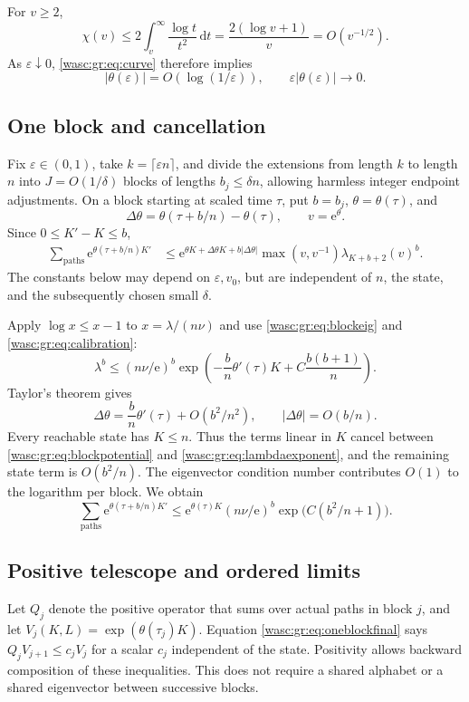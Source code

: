 \documentclass[11pt,a4paper]{article}
\theoremstyle{remark}\newtheorem{remark}[theorem]{Remark}
\newcommand{\dd}{\,\mathrm d}\newcommand{\ee}{\mathrm e}\newcommand{\Wc}{\mathcal W}
\numberwithin{equation}{section}
\begin{document}
For $v\ge2$,
\[
\chi(v)\le2\int_v^\infty\frac{\log t}{t^2}\dd t
=\frac{2(\log v+1)}v=O(v^{-1/2}).
\]
As $\varepsilon\downarrow0$, \eqref{wasc:gr:eq:curve} therefore implies
\begin{equation}\label{wasc:gr:eq:thetaendpoint}
|\theta(\varepsilon)|=O(\log(1/\varepsilon)),\qquad
\varepsilon|\theta(\varepsilon)|\longrightarrow0.
\end{equation}

\subsection{One block and cancellation}
Fix $\varepsilon\in(0,1)$, take $k=\lceil\varepsilon n\rceil$, and divide the extensions from length $k$ to length $n$ into $J=O(1/\delta)$ blocks of lengths $b_j\le\delta n$, allowing harmless integer endpoint adjustments. On a block starting at scaled time $\tau$, put $b=b_j$, $\theta=\theta(\tau)$, and
\[
\Delta\theta=\theta(\tau+b/n)-\theta(\tau),\qquad v=\ee^\theta.
\]
Since $0\le K'-K\le b$,
\begin{align}\label{wasc:gr:eq:blockpotential}
\sum_{\text{paths}}\ee^{\theta(\tau+b/n)K'}
&\le \ee^{\theta K+\Delta\theta K+b|\Delta\theta|}
\max(v,v^{-1})\lambda_{K+b+2}(v)^b.
\end{align}
The constants below may depend on $\varepsilon,v_0$, but are independent of $n$, the state, and the subsequently chosen small $\delta$.

Apply $\log x\le x-1$ to $x=\lambda/(n\nu)$ and use \eqref{wasc:gr:eq:blockeig} and \eqref{wasc:gr:eq:calibration}:
\begin{equation}\label{wasc:gr:eq:lambdaexponent}
\lambda^b\le(n\nu/\ee)^b
\exp\!\left(-\frac bn\theta'(\tau)K+C\frac{b(b+1)}n\right).
\end{equation}
Taylor's theorem gives
\[
\Delta\theta=\frac bn\theta'(\tau)+O(b^2/n^2),\qquad
|\Delta\theta|=O(b/n).
\]
Every reachable state has $K\le n$. Thus the terms linear in $K$ cancel between \eqref{wasc:gr:eq:blockpotential} and \eqref{wasc:gr:eq:lambdaexponent}, and the remaining state term is $O(b^2/n)$. The eigenvector condition number contributes $O(1)$ to the logarithm per block. We obtain
\begin{equation}\label{wasc:gr:eq:oneblockfinal}
\sum_{\text{paths}}\ee^{\theta(\tau+b/n)K'}
\le \ee^{\theta(\tau)K}(n\nu/\ee)^b
\exp\!\bigl(C(b^2/n+1)\bigr).
\end{equation}

\subsection{Positive telescope and ordered limits}
Let $Q_j$ denote the positive operator that sums over actual paths in block $j$, and let $V_j(K,L)=\exp(\theta(\tau_j)K)$. Equation \eqref{wasc:gr:eq:oneblockfinal} says $Q_jV_{j+1}\le c_jV_j$ for a scalar $c_j$ independent of the state. Positivity allows backward composition of these inequalities. This does not require a shared alphabet or a shared eigenvector between successive blocks.
\end{document}
